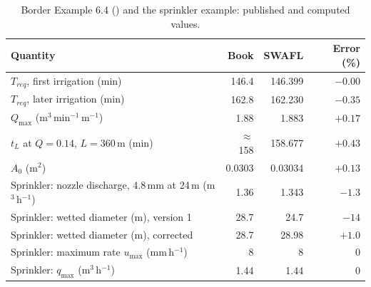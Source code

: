 \documentclass[preprint,12pt]{elsarticle}
\begin{document}
\begin{table}[H]\centering\small
\caption{Border Example 6.4 (\cite{Walker1987}) and the sprinkler example: published and computed values.}
\label{tab:border}
\begin{tabular}{lrrr}
\toprule
Quantity & Book & SWAFL & Error (\%)\\\midrule
$T_{req}$, first irrigation (min) & 146.4 & 146.399 & $-0.00$\\
$T_{req}$, later irrigation (min) & 162.8 & 162.230 & $-0.35$\\
$Q_{\max}$ (m$^3$\,min$^{-1}$\,m$^{-1}$) & 1.88 & 1.883 & $+0.17$\\
$t_L$ at $Q=0.14$, $L=360$\,m (min) & $\approx$158 & 158.677 & $+0.43$\\
$A_0$ (m$^2$) & 0.0303 & 0.03034 & $+0.13$\\
Sprinkler: nozzle discharge, 4.8\,mm at 24\,m (m$^3$\,h$^{-1}$) & 1.36 & 1.343 & $-1.3$\\
Sprinkler: wetted diameter (m), version 1 & 28.7 & 24.7 & $-14$\\
Sprinkler: wetted diameter (m), corrected & 28.7 & 28.98 & $+1.0$\\
Sprinkler: maximum rate $u_{\max}$ (mm\,h$^{-1}$) & 8 & 8 & 0\\
Sprinkler: $q_{\max}$ (m$^3$\,h$^{-1}$) & 1.44 & 1.44 & 0\\\bottomrule
\end{tabular}
\end{table}
\end{document}
